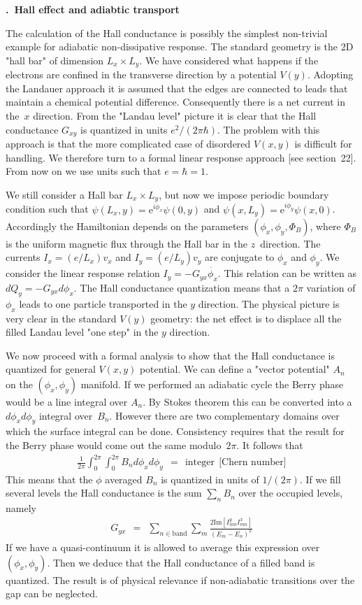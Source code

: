 \documentclass[onecolumn,fleqn, 11pt]{revtex4}
\newcommand{\im}{\mathrm{Im}}
\newcommand{\eexp}{\mathrm{e}^}
\newcommand{\beq}{\begin{eqnarray}}
\newcommand{\eeq}{\end{eqnarray}}
\renewcommand{\thesubsection}{\arabic{subsection}}
\renewcommand{\thesubsubsection}{\arabic{subsubsection}}
\newcommand{\sheadC}[1]
{
\addtocounter{subsubsection}{1}
\vspace{5mm}
{\bf \thesubsection.\thesubsubsection \ #1}  
\nopagebreak
\phantomsection
}
\begin{document}
\sheadC{Hall effect and adiabtic transport}

The calculation of the Hall conductance is possibly the simplest 
non-trivial example for adiabatic non-dissipative response. 
The standard geometry is the 2D "hall bar" of dimension ${L_x\times L_y}$. 
We have considered what happens if the electrons are confined in 
the transverse direction by a potential $V(y)$. 
Adopting the Landauer approach it is assumed that the edges are 
connected to leads that maintain a chemical 
potential difference. Consequently there is a net current in the~$x$
direction. From the "Landau level" picture it is clear that the 
Hall conductance $G_{xy}$ is quantized in units $e^2/(2\pi\hbar)$.
The problem with this approach is that the more complicated
case of disordered $V(x,y)$ is difficult for handling. We therefore 
turn to a formal linear response approach [see section~22]. 
From now on we use  units such that ${e=\hbar=1}$.

We still consider a Hall bar ${L_x\times L_y}$, but now 
we impose periodic boundary condition such that ${\psi(L_x,y)= \eexp{i\phi_x}\psi(0,y)}$ 
and ${\psi(x,L_y)= \eexp{i\phi_y}\psi(x,0)}$. 
Accordingly the Hamiltonian depends on the parameters ${(\phi_x,\phi_y,\Phi_B)}$, 
where $\Phi_B$ is the uniform magnetic flux through 
the Hall bar in the $z$~direction. The currents ${I_x=(e/L_x)v_x}$ 
and $I_y=(e/L_y)v_y$ are conjugate to $\phi_x$ and $\phi_y$.
We consider the linear response relation ${I_y=-G_{yx}\dot{\phi_x}}$.
This relation can be written as ${dQ_y=-G_{yx}d\phi_x}$. 
The Hall conductance quantization means that a $2\pi$ variation 
of $\phi_x$ leads to one particle transported in the $y$ direction.
The physical picture is very clear in the standard $V(y)$ geometry: 
the net effect is to displace all the filled Landau level 
"one step" in the $y$ direction.   

We now proceed with a formal analysis to show that the Hall conductance
is quantized for general $V(x,y)$ potential. We can define 
a "vector potential" $A_n$ on the $(\phi_x,\phi_y)$ manifold. 
If we performed an adiabatic cycle the Berry phase would be 
a line integral over $A_n$. By Stokes theorem this can be 
converted into a  $d\phi_x d\phi_y$ integral over~$B_n$.  
However there are two complementary domains over which the 
surface integral can be done. Consistency requires that the 
result for the Berry phase would come out the same modulo~$2\pi$.
It follows that 
\beq
\frac{1}{2\pi}\int_0^{2\pi}\int_0^{2\pi} B_n d\phi_x d\phi_y 
\ \ = \ \ \mbox{integer} \ \ \mbox{[Chern number]} 
\eeq
This means that the $\phi$ averaged $B_n$ is quantized in units 
of $1/(2\pi)$. If we fill several levels the Hall conductance 
is the sum ${\sum_n B_n}$ over the occupied levels, namely
\beq
G_{yx} \ \ = \ \ \sum_{n \in \mbox{band}}\sum_m 
\frac{2\im[I^y_{nm}I^x_{mn}]}{(E_m-E_n)^2}
\eeq
If we have a quasi-continuum it is allowed to 
average this expression over $(\phi_x,\phi_y)$.
Then we deduce that the Hall conductance of 
a filled band is quantized. The result is of physical 
relevance if non-adiabatic transitions 
over the gap can be neglected.   
\end{document}
